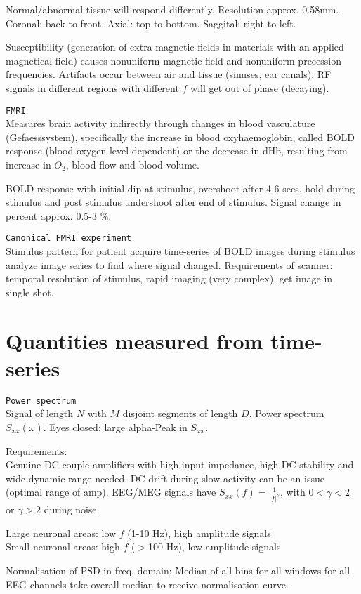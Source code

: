 Normal/abnormal tissue will respond differently. Resolution approx. 0.58mm.
Coronal: back-to-front. Axial: top-to-bottom. Saggital: right-to-left. \vs

Susceptibility (generation of extra magnetic fields in materials with an applied magnetical field) causes nonuniform magnetic field and nonuniform precession frequencies. Artifacts occur between air and tissue (sinuses, ear canals). RF signals in different regions with different $f$ will get out of phase (decaying).\vs

\verb!FMRI!\\
Measures brain activity indirectly through changes in blood vasculature (Gefaesssystem), specifically the increase in blood oxyhaemoglobin, called BOLD response (blood oxygen level dependent) or the decrease in dHb, resulting from increase in $O_2$, blood flow and blood volume.

BOLD response with initial dip at stimulus, overshoot after 4-6 secs, hold during stimulus and post stimulus undershoot after end of stimulus. Signal change in percent approx. 0.5-3 \%.\vs

\verb!Canonical FMRI experiment!\\
Stimulus pattern for patient \arr acquire time-series of BOLD images during stimulus \arr analyze image series to find where signal changed. Requirements of scanner: temporal resolution of stimulus, rapid imaging (very complex), get image in single shot.

\section{Quantities measured from time-series}
\verb!Power spectrum!\\
Signal of length $N$ with $M$ disjoint segments of length $D$. Power spectrum $S_{xx}(\omega)$. Eyes closed: large alpha-Peak in $S_{xx}$.\vs

Requirements:\\
Genuine DC-couple amplifiers with high input impedance, high DC stability and wide dynamic range needed. DC drift during slow activity can be an issue (optimal range of amp). EEG/MEG signals have $S_{xx}(f) = \frac{1}{|f|^\gamma}$, with $0<\gamma<2$ or $\gamma>2$ during noise.\vs

Large neuronal areas: low $f$ (1-10 Hz), high amplitude signals\\
Small neuronal areas: high $f$ ($>$100 Hz), low amplitude signals\vs

Normalisation of PSD in freq. domain: Median of all bins for all windows for all EEG channels \arr take overall median to receive normalisation curve.\vs

